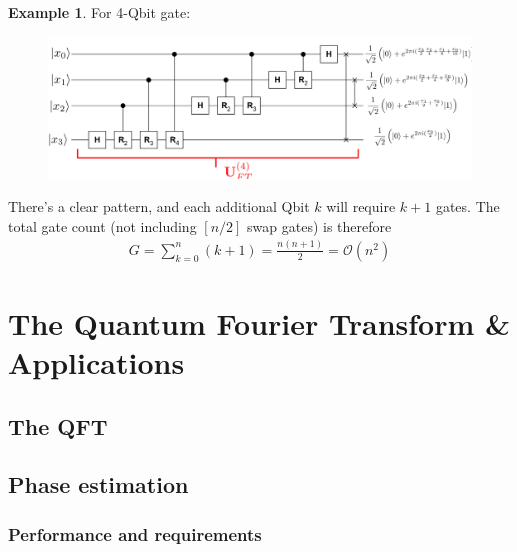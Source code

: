 \documentclass{book}
\theoremstyle{definition}
\newtheorem{exmp}{Example}[section]
\newcommand{\f}[2]{\frac{#1}{#2}}
\begin{document}
\begin{exmp}
	For 4-Qbit gate:
	\begin{figure}[!htb]
		\centering
		\includegraphics[scale=0.5]{qft9}
	\end{figure} 
\end{exmp}


There's a clear pattern, and each additional Qbit $k$ will require $k+1$ gates. The total gate count (not including $[n/2]$ swap gates) is therefore
\begin{align}
\boxed{G = \sum^n_{k=0} (k+1) = \f{n(n+1)}{2} = \mathcal{O}(n^2)   }
\end{align}

















 









\newpage


\section{The Quantum Fourier Transform \& Applications}


\subsection{The QFT}
\subsection{Phase estimation}
\subsubsection{Performance and requirements}
\end{document}
